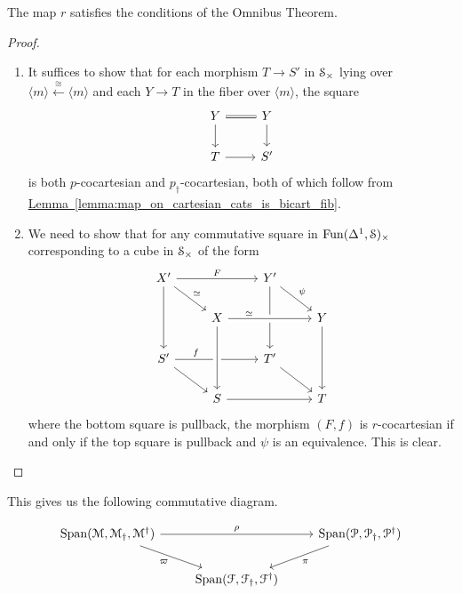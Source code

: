 \documentclass[main.tex]{subfiles}
\begin{document}
\begin{lemma}
  The map $r$ satisfies the conditions of the Omnibus Theorem.
\end{lemma}
\begin{proof}
  \leavevmode
  \begin{enumerate}
    \item It suffices to show that for each morphism $T \to S'$ in $\S_{\times}$ lying over $\langle m \rangle \overset{\cong}{\leftarrow} \langle m \rangle$ and each $Y \to T$ in the fiber over $\langle m \rangle$, the square
      \begin{equation*}
        \begin{tikzcd}
          Y
          \arrow[r, equals]
          \arrow[d]
          & Y
          \arrow[d]
          \\
          T
          \arrow[r]
          & S'
        \end{tikzcd}
      \end{equation*}
      is both $p$-cocartesian and $p_{\dagger}$-cocartesian, both of which follow from \hyperref[lemma:map_on_cartesian_cats_is_bicart_fib]{Lemma~\ref*{lemma:map_on_cartesian_cats_is_bicart_fib}}.

    \item We need to show that for any commutative square in $\Fun(\Delta^{1}, \S)_{\times}$ corresponding to a cube in $\S_{\times}$ of the form
      \begin{equation*}
        \begin{tikzcd}
          X'
          \arrow[rr, "F"]
          \arrow[dd]
          \arrow[dr, "\simeq"]
          && Y'
          \arrow[dd]
          \arrow[dr, "\psi"]
          \\
          & X
          \arrow[rr, crossing over, near start, "\simeq"]
          && Y
          \arrow[dd]
          \\
          S'
          \arrow[dr]
          \arrow[rr, near start, "f"]
          && T'
          \arrow[dr]
          \\
          & S
          \arrow[from=uu, crossing over]
          \arrow[rr]
          && T
        \end{tikzcd}
      \end{equation*}
      where the bottom square is pullback, the morphism $(F, f)$ is $r$-cocartesian if and only if the top square is pullback and $\psi$ is an equivalence. This is clear.
  \end{enumerate}
\end{proof}

This gives us the following commutative diagram.

\begin{equation*}
  \begin{tikzcd}
    \Span\triple{M}
    \arrow[rr, "\rho"]
    \arrow[dr, swap, "\varpi"]
    && \Span\triple{P}
    \arrow[dl, "\pi"]
    \\
    & \Span\triple{F}
  \end{tikzcd}
\end{equation*}
\end{document}
